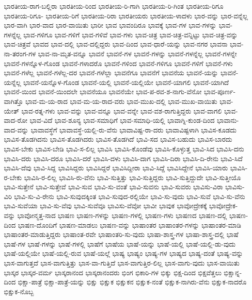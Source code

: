 {ಭಾರತೀಯ-ರಾಗ-ಬಲ್ಲಿರಾ
ಭಾರತೀಯ-ರಿಂದ
ಭಾರತೀಯ-ರಿ-ಗಾಗಿ
ಭಾರತೀಯ-ರಿ-ಗಿಂತ
ಭಾರತೀಯ-ರಿಗೂ
ಭಾರತೀಯ-ರಿಗೂ-
ಭಾರತೀಯ-ರಿಗೆ
ಭಾರತೀಯ-ರಿರಾ
ಭಾರತೀಯರು
ಭಾರತೀಯ-ಳಾದಳು
ಭಾರ-ವನ್ನು
ಭಾರ-ವನ್ನೆಲ್ಲ
ಭಾರ-ವಾಗಿ
ಭಾರ-ವಾದ
ಭಾರ-ವಾಯಿತು
ಭಾರೀ
ಭಾವ
ಭಾವಂದಿರೂ
ಭಾವಕ್ಕೆ
ಭಾವ-ಗಳ
ಭಾವ-ಗಳನ್ನು
ಭಾವ-ಗಳನ್ನೆಲ್ಲ
ಭಾವ-ಗಳಿಗೂ
ಭಾವ-ಗಳಿಗೆ
ಭಾವ-ಗಳಿವೆ
ಭಾವ-ಗಳು
ಭಾವ-ಚಿತ್ರ
ಭಾವ-ಚಿತ್ರ-ವನ್ನಿಟ್ಟು
ಭಾವ-ಚಿತ್ರ-ವನ್ನು
ಭಾವ-ಚಿತ್ರವೆ
ಭಾವದ
ಭಾವ-ದಲ್ಲಿ
ಭಾವ-ದಲ್ಲಿದ್ದರು
ಭಾವ-ದಿಂದ
ಭಾವ-ಧಾರೆ-ಯನ್ನು
ಭಾವ-ನಗರ
ಭಾವನಾ
ಭಾವ-ನಾ-ತರಂಗ-ಗಳ
ಭಾವ-ನಾ-ಮೃತ-ವನ್ನೂ
ಭಾವನೆ
ಭಾವನೆ-ಗಳ
ಭಾವನೆ-ಗಳನ್ನು
ಭಾವನೆ-ಗಳನ್ನೆಲ್ಲ
ಭಾವನೆ-ಗಳನ್ನೇ
ಭಾವನೆ-ಗಳನ್ನೊಳ-ಗೊಂಡ
ಭಾವನೆ-ಗಳಾದರೊ
ಭಾವನೆ-ಗಳಿಂದ
ಭಾವನೆ-ಗಳಿಗೂ
ಭಾವನೆ-ಗಳಿಗೆ
ಭಾವನೆ-ಗಳು
ಭಾವನೆ-ಗಳೆಲ್ಲ
ಭಾವನೆ-ಗಳೆಲ್ಲ-ದರ
ಭಾವನೆ-ಗಳೆಲ್ಲಾ
ಭಾವನೆಗೂ
ಭಾವನೆಗೆ
ಭಾವನೆಯ
ಭಾವನೆ-ಯನ್ನು
ಭಾವನೆ-ಯನ್ನೆಲ್ಲ
ಭಾವನೆ-ಯನ್ನೊಳ-ಗೊಂಡ
ಭಾವನೆ-ಯಲ್ಲಿ
ಭಾವನೆ-ಯಲ್ಲಿಯೇ
ಭಾವನೆ-ಯಾಗಲಿ
ಭಾವನೆ-ಯಾಗಿದೆ
ಭಾವನೆ-ಯಿಂದ
ಭಾವನೆ-ಯಿಂದಲೇ
ಭಾವನೆಯೂ
ಭಾವನೆಯೇ
ಭಾವ-ಪ-ರವ-ಶ-ನಾಗು-ವೆನೋ
ಭಾವ-ಪೂರ್ಣ-ವಾಗಿತ್ತೊ
ಭಾವ-ಮ-ಯ-ರಾದ
ಭಾವ-ಮ-ಯ-ರಾದ-ವರು
ಭಾವ-ಮುಖ-ದಲ್ಲಿ
ಭಾವ-ಮುಖ-ವಾಯಿತು
ಭಾವ-ಯೇತ್
ಭಾವ-ರತ್ನ-ಗಳು
ಭಾವ-ವನ್ನು
ಭಾವ-ವನ್ನೂ
ಭಾವ-ವನ್ನೇ
ಭಾವ-ವಶ-ರಾಗುತ್ತಿದ್ದರು
ಭಾವ-ವಾಗಲಿ
ಭಾವ-ವಾದ-ರೋ
ಭಾವ-ವಿದೆ
ಭಾವ-ಶೂನ್ಯ
ಭಾವ-ಸಮಾಧಿಗೆ
ಭಾವ-ಸಮಾಧಿ-ಯಲ್ಲಿ
ಭಾವಾಗ್ನಿ-ಕುಂಡ-ದಿಂದ
ಭಾವಾನು-ವಾದ-ವನ್ನು
ಭಾವಾವಸ್ಥೆಗೆ
ಭಾವಾವಸ್ಥೆ-ಯಲ್ಲಿ-ರು-ವೆನು
ಭಾವಾವಿಷ್ಟ-ರಾ-ದರು
ಭಾವಾವಿಷ್ಟಳಾಗಿ
ಭಾವಿಸ-ಕೂಡದು
ಭಾವಿಸ-ತೊಡಗಿದನು
ಭಾವಿಸ-ತೊಡಗಿದರು
ಭಾವಿಸ-ತೊಡಗಿದೆ
ಭಾವಿ-ಸದ
ಭಾವಿಸ-ಬಹುದು
ಭಾವಿಸ-ಬಾರದು
ಭಾವಿಸ-ಬೇಕು
ಭಾವಿಸ-ಬೇಡಿ
ಭಾವಿ-ಸ-ಲಿಲ್ಲ
ಭಾವಿಸಿ
ಭಾವಿಸಿ-ಕೊಂಡೆವು
ಭಾವಿಸಿ-ಕೊಳ್ಳುತ್ತ
ಭಾವಿ-ಸಿದ
ಭಾವಿಸಿ-ದನು
ಭಾವಿಸಿ-ದರು
ಭಾವಿಸಿ-ದರೂ
ಭಾವಿಸಿ-ದರೆ
ಭಾವಿಸಿ-ದಳು
ಭಾವಿಸಿ-ದಾಗ
ಭಾವಿಸಿ-ದಿರಾ
ಭಾವಿಸಿ-ದಿ-ರೇನು
ಭಾವಿ-ಸಿದೆ
ಭಾವಿಸಿ-ದೆವು
ಭಾವಿ-ಸಿದ್ದ
ಭಾವಿಸಿದ್ದರು
ಭಾವಿಸಿದ್ದರೆ
ಭಾವಿಸಿದ್ದೀರಾ
ಭಾವಿ-ಸಿದ್ದೆ
ಭಾವಿಸಿದ್ದೇನೆ
ಭಾವಿಸಿ-ಯಾರು
ಭಾವಿಸಿ-ರ-ಬೇಕು
ಭಾವಿಸಿ-ರ-ಲಿಲ್ಲ
ಭಾವಿಸಿ-ರು-ವೆನು
ಭಾವಿ-ಸುತ್ತಿತ್ತು
ಭಾವಿ-ಸುತ್ತಿದ್ದರು
ಭಾವಿ-ಸುತ್ತಿದ್ದುದೇ
ಭಾವಿ-ಸುತ್ತೀಯೊ
ಭಾವಿ-ಸುತ್ತೇನೆ
ಭಾವಿ-ಸುತ್ತೇವೆ
ಭಾವಿ-ಸುವ
ಭಾವಿ-ಸು-ವಂತೆ
ಭಾವಿ-ಸುವನು
ಭಾವಿ-ಸುವರು
ಭಾವಿಸು-ವಿರಾ
ಭಾವಿಸು-ವಿರಿ
ಭಾವಿ-ಸು-ವಿ-ರೇನು
ಭಾವಿ-ಸುವುದಕ್ಕಿಂತ
ಭಾವಿ-ಸುವುದ-ರಲ್ಲಿಯೇ
ಭಾವಿ-ಸು-ವುದು
ಭಾವಿ-ಸುವೆ
ಭಾವಿ-ಸು-ವೆನು
ಭಾವಿ-ಸುವೆಯಾ
ಭಾವಿ-ಸು-ವೆವು
ಭಾವಿ-ಸುವೆವೂ
ಭಾವಿಸು-ವೆವೋ
ಭಾವೀ
ಭಾವುಕ
ಭಾವೋದ್ರೇಕಕ್ಕೆ
ಭಾವೋದ್ರೇಕ-ವನ್ನು
ಭಾವೋನ್ಮತ್ತ-ನಾದ
ಭಾಷಣ
ಭಾಷಣ-ಗಳನ್ನು
ಭಾಷಣ-ಗಳಲ್ಲಿ
ಭಾಷಣ-ಗಳು
ಭಾಷಣದ
ಭಾಷಣ-ದಲ್ಲಿ
ಭಾಷಣ-ದಿಂದ
ಭಾಷಣ-ದೊಂದಿಗೆ
ಭಾಷಣ-ಮಾಡಲು
ಭಾಷಣ-ವನ್ನು
ಭಾಷಾಂತರ
ಭಾಷಾಂತರ-ಗಳನ್ನು
ಭಾಷಾಂತರ-ಮಾಡಿ
ಭಾಷಾಂತರ-ಮಾಡುತ್ತಿದ್ದರು
ಭಾಷಾಂತ-ರವೇ
ಭಾಷಾಂತರಿ-ಸು-ವುದು
ಭಾಷಾ-ಶಾಸ್ತ್ರ-ಗಳ
ಭಾಷಾ-ಶಾಸ್ತ್ರ-ದಲ್ಲಿ
ಭಾಷೆ
ಭಾಷೆ-ಗಳ
ಭಾಷೆ-ಗಳನ್ನು
ಭಾಷೆ-ಗಳಲ್ಲಿ
ಭಾಷೆಗೆ
ಭಾಷೆಯ
ಭಾಷೆ-ಯನ್ನು
ಭಾಷೆ-ಯಲ್ಲಿ
ಭಾಷೆ-ಯಲ್ಲಿ-ಡು-ವುದು
ಭಾಷೆ-ಯಲ್ಲಿಯೇ
ಭಾಷೆ-ಯಲ್ಲಿ-ರುವ
ಭಾಷೆ-ಯಲ್ಲೆ
ಭಾಷ್ಯ
ಭಾಷ್ಯಂ
ಭಾಷ್ಯ-ಗಳ
ಭಾಷ್ಯದ
ಭಾಷ್ಯ-ದಂತೆ
ಭಾಷ್ಯ-ವನ್ನು
ಭಾಸ-ವಾಗುತ್ತದೆ
ಭಾಸ-ವಾಗುತ್ತಿತ್ತು
ಭಾಸ-ವಾ-ಗುತ್ತಿದೆ
ಭಾಸ-ವಾಗುತ್ತಿರ-ಲಿಲ್ಲ
ಭಾಸ-ವಾಗು-ವುದು
ಭಾಸ-ವಾಯಿತು
ಭಾಸ್ಕರ
ಭಾಸ್ಕರ-ವರ್ಮ
ಭಾಸ್ಕರಾನಂದ
ಭಾಸ್ಕರಾನಂದರು
ಭಿಂಗ
ಭಿಕಾರಿ-ಗಳ
ಭಿಕ್ಕು
ಭಿಕ್ಷ-ದಿಂದ
ಭಿಕ್ಷವೆತ್ತಲು
ಭಿಕ್ಷಾನ್ನ-ದಿಂದ
ಭಿಕ್ಷಾ-ಪಾತ್ರೆ
ಭಿಕ್ಷಾ-ಪಾತ್ರೆ-ಯನ್ನು
ಭಿಕ್ಷು
ಭಿಕ್ಷುಕ
ಭಿಕ್ಷುಕನ
ಭಿಕ್ಷುಕ-ನಂತೆ
ಭಿಕ್ಷುಕ-ನಾಗಿರು-ವೆನು
ಭಿಕ್ಷುಕ-ನಾದರೊ
ಭಿಕ್ಷುಕ-ನೊಬ್ಬ
}
